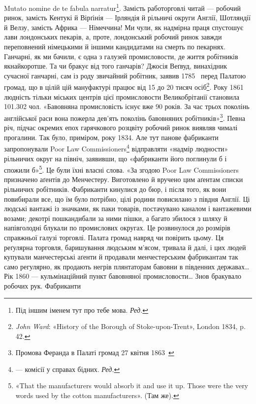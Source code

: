 Mutato nomine de te fabula narratur\footnote*{
Під іншим іменем тут про тебе мова. \emph{Ред.}
}.  Замість работорговлі
читай — робочий ринок, замість Кентукі й Вірґінія — Ірляндія
й рільничі округи Англії, Шотляндії й Велзу, замість Африка —
Німеччина! Ми чули, як надмірна праця спустошує лави лондонських
пекарів, а, проте, лондонський робочий ринок завжди
переповнений німецькими й іншими кандидатами на смерть по
пекарнях. Ганчарні, як ми бачили, є одна з галузей промисловости,
де життя робітників якнайкоротше. Та чи бракує від того ганчарів?
Джосія Веґвуд, винахідник сучасної ганчарні, сам із роду
звичайний робітник, заявив 1785~ перед Палатою громад,
що в цілій цій мануфактурі працює від 15 до 20 тисяч осіб\footnote{
\emph{John Ward}: «History of the Borough of Stoke-upon-Trent», London
1834, p. 42.
}.
Року 1861 людність тільки міських центрів цієї промисловости
Великобрітанії становила \num{101.302} чол. «Бавовняна промисловість
існує вже 90 років. За час трьох поколінь англійської раси
вона пожерла дев’ять поколінь бавовняних робітників»\footnote{
Промова Феранда в Палаті громад 27 квітня 1863~
}.
Певна річ, підчас окремих епох гарячкового розцвіту робочий
ринок виявляв чималі прогалини. Так було, приміром, року 1834.
Але тут панове фабриканти запропонували Poor Law Commissioners\footnote*{
— комісії у справах бідних. \emph{Ред.}
}
відправляти «надмір людности» рільничих округ на північ,
заявивши, що «фабриканти його поглинули б і спожили б»\footnote{
«That the manufacturers would absorb it and use it up. Those were
the very words used by the cotton manufacturers». (Там же).
}.
Це були їхні власні слова. «За згодою Poor Law Commissioners
призначено аґентів до Менчестеру. Виготовлено й вручено цим
аґентам списки рільничих робітників. Фабриканти кинулися до
бюр, і після того, як вони повибирали все, що їм було потрібно,
цілі родини повисилано з півдня Англії. Ці людські вантажі із
значками, як паки товарів, постачувано каналом і вантажевими
возами; декотрі пошкандибали за ними пішки, а багато збилося
з шляху й напівголодні блукали по промислових округах. Це розвинулося
до розмірів справжньої галузі торговлі. Палата громад
навряд чи повірить цьому. Ця реґулярна торговля, баришування
людським м’ясом, тривала й далі, і цих людей купували манчестерські
аґенти й продавали менчестерським фабрикантам так
само регулярно, як продають негрів плянтаторам бавовни в південних
державах\dots{} Рік 1860 — кульмінаційний пункт бавовняної
промисловости\dots{} Знов бракувало робочих рук. Фабриканти
